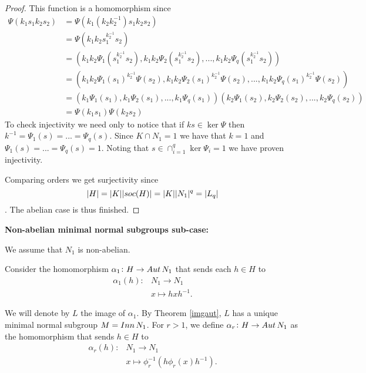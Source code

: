 \begin{proof}
    This function is a homomorphism since
    \begin{align*}
        \Psi(k_1s_1k_2s_2) & = \Psi(k_1(k_2k_2^{-1})s_1k_2s_2) \\
                           & = \Psi(k_1k_2s_1^{k_2^{-1}}s_2) \\ 
                           & = (k_1k_2\Psi_1(s_1^{k_2^{-1}}s_2),k_1k_2\Psi_2(s_1^{k_2^{-1}}s_2),...,k_1k_2\Psi_q(s_1^{k_2^{-1}}s_2)) \\
                           & = (k_1k_2\Psi_1(s_1)^{k_2^{-1}}\Psi(s_2),k_1k_2\Psi_2(s_1)^{k_2^{-1}}\Psi(s_2),...,k_1k_2\Psi_q(s_1)^{k_2^{-1}}\Psi(s_2)) \\
                           & = (k_1\Psi_1(s_1),k_1\Psi_2(s_1),...,k_1\Psi_q(s_1))(k_2\Psi_1(s_2),k_2\Psi_2(s_2),...,k_2\Psi_q(s_2)) \\
                           & = \Psi(k_1s_1)\Psi(k_2s_2)
    \end{align*}
    To check injectivity we need only to notice that if $ks \in \ker \Psi$ then $k^{-1} = \Psi_1(s) = ... = \Psi_q(s)$. Since $K \cap N_1 = 1$ we have that $k = 1$ and $\Psi_1(s) = ... = \Psi_q(s) = 1$. Noting that 
    $s \in \cap_{i=1}^q \ker \Psi_i = 1$ we have proven injectivity.

    Comparing orders we get surjectivity since $$| H | = | K || soc {(H)} | = | K || N_1 |^q = | L_q |$$. The abelian case is thus finished.
\end{proof}

\vspace{\baselineskip}
\noindent
\textbf{Non-abelian minimal normal subgroups sub-case:}
\vspace{\baselineskip}

We assume that $N_1$ is non-abelian. 

Consider the homomorphism $\alpha_1 \colon H \rightarrow Aut\, {N}_1$ that sends each $h \in H$ to
\begin{align*}
    \alpha_1(h) \colon &N_1 \rightarrow N_1 \\
                    &x \mapsto hxh^{-1}.
\end{align*}

We will denote by $L$ the image of $\alpha_1$. By Theorem \ref{imgaut}, $L$ has a unique minimal normal subgroup $M = Inn\, {N}_1$. For $r > 1$, we define $\alpha_r \colon H \rightarrow Aut\, {N}_1$ as the homomorphism that sends $h \in H$ to
\begin{align*}
    \alpha_r(h) \colon &N_1 \rightarrow N_1 \\
                    &x \mapsto \phi_r^{-1}(h\phi_r(x)h^{-1}).
\end{align*}

